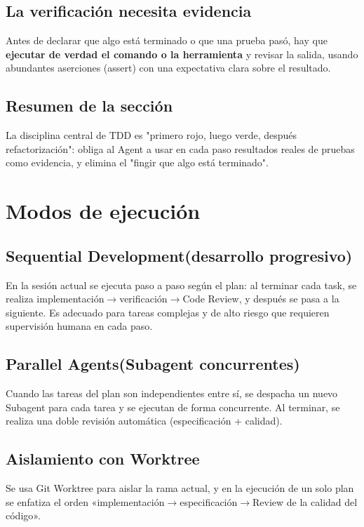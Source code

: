 \documentclass[a4paper]{article}
\begin{document}
\subsection{La verificación necesita evidencia}

Antes de declarar que algo está terminado o que una prueba pasó, hay que \textbf{ejecutar de verdad el comando o la herramienta} y revisar la salida, usando abundantes aserciones (assert) con una expectativa clara sobre el resultado.

\subsection{Resumen de la sección}

La disciplina central de TDD es "primero rojo, luego verde, después refactorización": obliga al Agent a usar en cada paso resultados reales de pruebas como evidencia, y elimina el "fingir que algo está terminado".

\section{Modos de ejecución}

\subsection{Sequential Development(desarrollo progresivo)}

En la sesión actual se ejecuta paso a paso según el plan: al terminar cada task, se realiza implementación$\rightarrow$verificación$\rightarrow$Code Review, y después se pasa a la siguiente. Es adecuado para tareas complejas y de alto riesgo que requieren supervisión humana en cada paso.

\subsection{Parallel Agents(Subagent concurrentes)}

Cuando las tareas del plan son independientes entre sí, se despacha un nuevo Subagent para cada tarea y se ejecutan de forma concurrente. Al terminar, se realiza una doble revisión automática (especificación + calidad).

\subsection{Aislamiento con Worktree}

Se usa Git Worktree para aislar la rama actual, y en la ejecución de un solo plan se enfatiza el orden «implementación$\rightarrow$especificación$\rightarrow$Review de la calidad del código».
\end{document}
